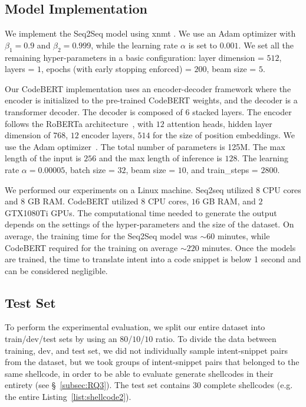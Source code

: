 \subsection{Model Implementation}
We implement the Seq2Seq model using {\selectfont xnmt} \cite{neubig2018xnmt}. We use an Adam optimizer \cite{kingma2014adam} with $\beta_1=0.9$ and $\beta_2=0.999$, while the learning rate $\alpha$ is set to $0.001$. We set all the remaining hyper-parameters in a basic configuration: layer dimension = $512$, layers = $1$, epochs (with early stopping enforced) = $200$, beam size = $5$. 

Our CodeBERT implementation uses an encoder-decoder framework where the encoder is initialized to the pre-trained CodeBERT weights, and the decoder is a transformer decoder. The decoder is composed of $ 6$ stacked layers. The encoder follows the RoBERTa architecture~\cite{liu2019roberta}, with $12$ attention heads, hidden layer dimension of $768$, $12$ encoder layers, $514$ for the size of position embeddings. We use the Adam optimizer~\cite{kingma2014adam}. The total number of parameters is 125M. The max length of the input is $256$ and the max length of inference is $128$. The learning rate $\alpha = 0.00005$, batch size = $32$, beam size = $10$, and train\_steps = $2800$.

We performed our experiments on a Linux machine. Seq2seq utilized $8$ CPU cores and $8$ GB RAM. CodeBERT utilized 8 CPU cores, $16$ GB RAM, and $2$ GTX1080Ti GPUs.
The computational time needed to generate the output depends on the settings of the hyper-parameters and the size of the dataset. 
On average, the training time for the Seq2Seq model was $\sim60$ minutes, while CodeBERT required for the training on average $\sim220$ minutes.
Once the models are trained, the time to translate intent into a code snippet is below 1 second and can be considered negligible. 

\subsection{Test Set}
To perform the experimental evaluation, we split our entire dataset into train/dev/test sets by using an $80$/$10$/$10$ ratio.
To divide the data between training, dev, and test set, we did not individually sample intent-snippet pairs from the dataset, but we took groups of intent-snippet pairs that belonged to the same shellcode, in order to be able to evaluate generate shellcodes in their entirety (see \S~\ref{subsec:RQ3}). The test set contains $30$ complete shellcodes (e.g. the entire Listing~\ref{list:shellcode2}). 


